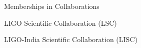 \begin{rubric}{Memberships in Collaborations}

\entry*[2022 -- Present]
	LIGO Scientific Collaboration (LSC)

\entry*[2022 -- Present]
	LIGO-India Scientific Collaboration (LISC)

\end{rubric}
